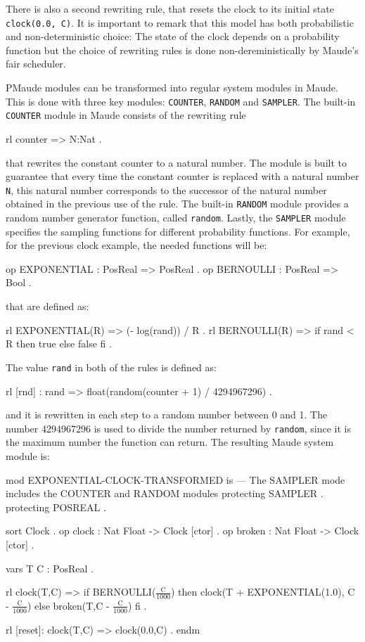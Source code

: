 There is also a second rewriting rule, that resets the clock to its initial state \texttt{clock(0.0, C)}. It is important to remark that this model has both probabilistic and non-deterministic choice: The state of the clock depends on a probability function but the choice of rewriting rules is done non-dereministically by Maude's fair scheduler.

PMaude modules can be transformed into regular system modules in Maude. This is done with three key modules: \texttt{COUNTER}, \texttt{RANDOM} and \texttt{SAMPLER}. The built-in \texttt{COUNTER} module in Maude consists of the rewriting rule
\\
\begin{maude}
rl counter => N:Nat .
\end{maude}
that rewrites the constant counter to a natural number. The module is built to guarantee that every time the constant counter is replaced with a natural number \texttt{N}, this natural number corresponds to the successor of the natural number obtained in the previous use of the rule. The built-in \texttt{RANDOM} module provides a random number generator function, called \texttt{random}. Lastly, the \texttt{SAMPLER} module specifies the sampling functions for different probability functions. For example, for the previous clock example, the needed functions will be:
\\
\begin{maude}
op EXPONENTIAL : PosReal => PosReal .
op BERNOULLI : PosReal => Bool .
\end{maude}
that are defined as:
\\
\begin{maude}
rl EXPONENTIAL(R) => (- log(rand)) / R .
rl BERNOULLI(R) => if rand < R then true else false fi .
\end{maude}
The value \texttt{rand} in both of the rules is defined as:
\\
\begin{maude}
rl [rnd] : rand => float(random(counter + 1) / 4294967296) .
\end{maude}
and it is rewritten in each step to a random number between 0 and 1. The number 4294967296 is used to divide the number returned by \texttt{random}, since it is the maximum number the function can return. The resulting Maude system module \cite{Agha2006} is:
\\
\begin{maude}
mod EXPONENTIAL-CLOCK-TRANSFORMED is 
  --- The SAMPLER mode includes the COUNTER and RANDOM modules
  protecting SAMPLER .
  protecting POSREAL .
  
  sort Clock . 
  op clock : Nat Float -> Clock [ctor] . 
  op broken : Nat Float -> Clock [ctor] . 
  
  vars T C : PosReal . 
  
  rl clock(T,C) => if BERNOULLI($\frac{\text{C}}{1000}$) then 
                        clock(T + EXPONENTIAL(1.0), C - $\frac{\text{C}}{1000}$) 
                   else 
                        broken(T,C - $\frac{\text{C}}{1000}$)
                   fi .
  
  rl [reset]: clock(T,C) => clock(0.0,C) .
endm
\end{maude}

